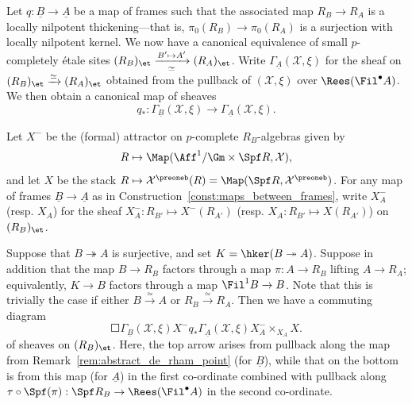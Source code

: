\documentclass[10pt]{amsart}
\begin{document}
\begin{construction}
\label{const:maps_between_frames}
Let $q:\underline{B}\to \underline{A}$ be a map of frames such that the associated map ${R_B}\to {R_A}$ is a locally nilpotent thickening---that is, $\pi_0({R_B})\to \pi_0({R_A})$ is a surjection with locally nilpotent kernel. We now have a canonical equivalence of small $p$-completely \'etale sites $(R_B)_{\et}\xrightarrow[\simeq]{B'\mapsto A'}(R_A)_{\et}$. Write $\Gamma_{\underline{A}}(\mathcal{X},\xi)$ for the sheaf on $(R_B)_{\et}\xrightarrow{\simeq}(R_A)_{\et}$ obtained from the pullback of $(\mathcal{X},\xi)$ over $\Rees(\Fil^\bullet A)$. We then obtain a canonical map of sheaves
\[
q_*:\Gamma_{\underline{B}}(\mathcal{X},\xi)\to \Gamma_{\underline{A}}(\mathcal{X},\xi).
\]
\end{construction}

\begin{definition}
Let $X^{-}$ be the (formal) attractor on $p$-complete $R_B$-algebras given by
\[
R\mapsto \Map(\Aff^1/\Gm\times \Spf R,\mathcal{X}),
\]
and let $X$ be the stack $R\mapsto \mathcal{X}^\preoneb(R) = \Map(\Spf R,\mathcal{X}^\preoneb)$. For any map of frames $\underline{B}\to \underline{A}$ as in Construction~\ref{const:maps_between_frames}, write $X^-_A$ (resp. $X_A$) for the sheaf $X^-_A:R_{B'}\mapsto X^-(R_{A'})$ (resp. $X_A:R_{B'}\mapsto X(R_{A'})$) on $(R_B)_{\et}$.
\end{definition}


\begin{construction}
\label{const:commuting_square_frames}
Suppose that $B\twoheadrightarrow A$ is surjective, and set $K = \hker(B\twoheadrightarrow A)$. Suppose in addition that the map $B\to {R_B}$ factors through a map $\pi:A\to {R_B}$ lifting $A\to {R_A}$; equivalently, $K\to B$ factors through a map $\Fil^1B\to B$. Note that this is trivially the case if either $B\xrightarrow{\simeq}A$ or ${R_B}\xrightarrow{\simeq}{R_A}$. Then we have a commuting diagram
\[
\Square{\Gamma_{\underline{B}}(\mathcal{X},\xi)}{}{X^{-}}{q_*}{}{\Gamma_{\underline{A}}(\mathcal{X},\xi)}{}{X^{-}_A\times_{X_A}X}.
\]
of sheaves on $(R_B)_{\et}$. Here, the top arrow arises from pullback along the map from Remark~\ref{rem:abstract_de_rham_point} (for $\underline{B}$), while that on the bottom is from this map (for $\underline{A}$) in the first co-ordinate combined with pullback along $\tau\circ \Spf(\pi):\Spf R_B\to \Rees(\Fil^\bullet A)$ in the second co-ordinate.
\end{construction}
\end{document}
